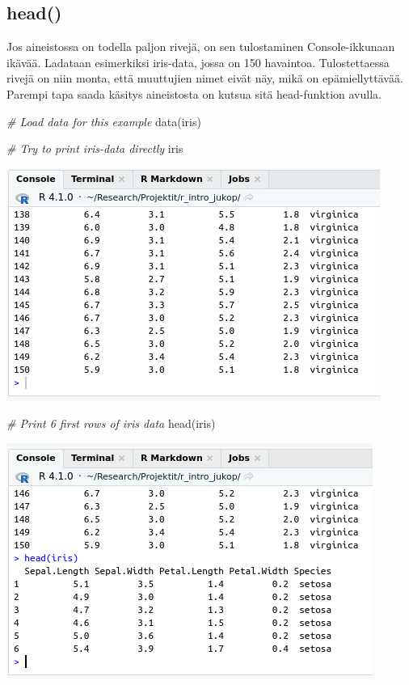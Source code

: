 \documentclass[
]{book}
\newenvironment{Shaded}{\begin{snugshade}}{\end{snugshade}}
\newcommand{\CommentTok}[1]{\textcolor[rgb]{0.56,0.35,0.01}{\textit{#1}}}
\newcommand{\FunctionTok}[1]{\textcolor[rgb]{0.00,0.00,0.00}{#1}}
\newcommand{\NormalTok}[1]{#1}
\begin{document}
\hypertarget{head}{%
\subsection{head()}\label{head}}

Jos aineistossa on todella paljon rivejä, on sen tulostaminen Console-ikkunaan ikävää. Ladataan esimerkiksi iris-data, jossa on 150 havaintoa. Tulostettaessa rivejä on niin monta, että muuttujien nimet eivät näy, mikä on epämiellyttävää. Parempi tapa saada käsitys aineistosta on kutsua sitä head-funktion avulla.

\begin{Shaded}
\begin{Highlighting}[]
\CommentTok{\# Load data for this example}
\FunctionTok{data}\NormalTok{(iris)}

\CommentTok{\# Try to print iris{-}data directly}
\NormalTok{iris}
\end{Highlighting}
\end{Shaded}

\includegraphics{files/02-data_types/iris_print_data.png}

\begin{Shaded}
\begin{Highlighting}[]
\CommentTok{\# Print 6 first rows of iris data}
\FunctionTok{head}\NormalTok{(iris)}
\end{Highlighting}
\end{Shaded}

\includegraphics{files/02-data_types/iris_print_head_data.png}
\end{document}
